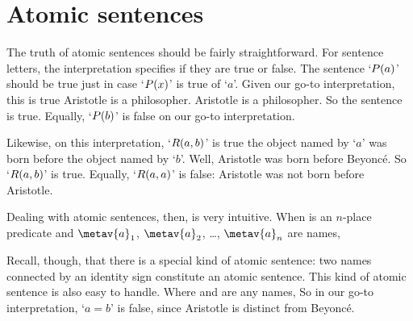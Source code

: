 \section{Atomic sentences}
The truth of atomic sentences should be fairly straightforward. For sentence letters, the interpretation specifies if they are true or false. The sentence `$\mathord{P}(a)$' should be true just in case `$\mathord{P}(x)$' is true of `$a$'. Given our go-to interpretation, this is true \ifeff{} Aristotle is a philosopher. Aristotle is a philosopher. So the sentence is true. Equally, `$\mathord{P}(b)$' is false on our go-to interpretation.

Likewise, on this interpretation, `$\mathord{R}(a,b)$' is true \ifeff{} the object named by `$a$' was born before the object named by `$b$'. Well, Aristotle was born before Beyonc\'e. So `$\mathord{R}(a,b)$' is true. Equally, `$\mathord{R}(a,a)$' is false: Aristotle was not born before Aristotle.

Dealing with atomic sentences, then, is very intuitive. When  is an $n$-place predicate and $\metav{a}_1$, $\metav{a}_{2}$, \dots, $\metav{a}_{n}$ are names, 

Recall, though, that there is a special kind of atomic sentence: two names connected by an identity sign constitute an atomic sentence. This kind of atomic sentence is also easy to handle. Where  and  are any names, 
So in our go-to interpretation, `$a = b$' is false, since Aristotle is distinct from Beyonc\'e.


